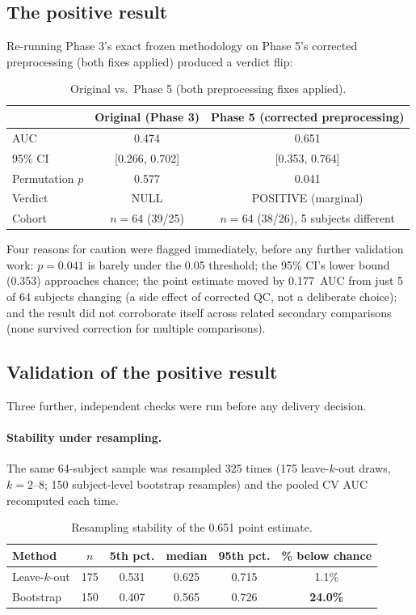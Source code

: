 \documentclass[11pt]{article}
\begin{document}
\subsection{The positive result}

Re-running Phase 3's exact frozen methodology on Phase 5's corrected
preprocessing (both fixes applied) produced a verdict flip:

\begin{table}[h]
\centering
\caption{Original vs.\ Phase 5 (both preprocessing fixes applied).}
\begin{tabular}{lcc}
\toprule
 & Original (Phase 3) & Phase 5 (corrected preprocessing) \\
\midrule
AUC & 0.474 & 0.651 \\
95\% CI & [0.266, 0.702] & [0.353, 0.764] \\
Permutation $p$ & 0.577 & 0.041 \\
Verdict & NULL & POSITIVE (marginal) \\
Cohort & $n=64$ (39/25) & $n=64$ (38/26), 5 subjects different \\
\bottomrule
\end{tabular}
\end{table}

Four reasons for caution were flagged immediately, before any further
validation work: $p=0.041$ is barely under the 0.05 threshold; the 95\%
CI's lower bound (0.353) approaches chance; the point estimate moved by
0.177~AUC from just 5 of 64 subjects changing (a side effect of corrected
QC, not a deliberate choice); and the result did not corroborate itself
across related secondary comparisons (none survived correction for
multiple comparisons).

\subsection{Validation of the positive result}

Three further, independent checks were run before any delivery decision.

\paragraph{Stability under resampling.} The same 64-subject sample was
resampled 325 times (175 leave-$k$-out draws, $k=2$--8; 150
subject-level bootstrap resamples) and the pooled CV AUC recomputed each
time.

\begin{table}[h]
\centering
\caption{Resampling stability of the 0.651 point estimate.}
\begin{tabular}{lccccc}
\toprule
Method & $n$ & 5th pct. & median & 95th pct. & \% below chance \\
\midrule
Leave-$k$-out & 175 & 0.531 & 0.625 & 0.715 & 1.1\% \\
Bootstrap & 150 & 0.407 & 0.565 & 0.726 & \textbf{24.0\%} \\
\bottomrule
\end{tabular}
\end{table}
\end{document}
